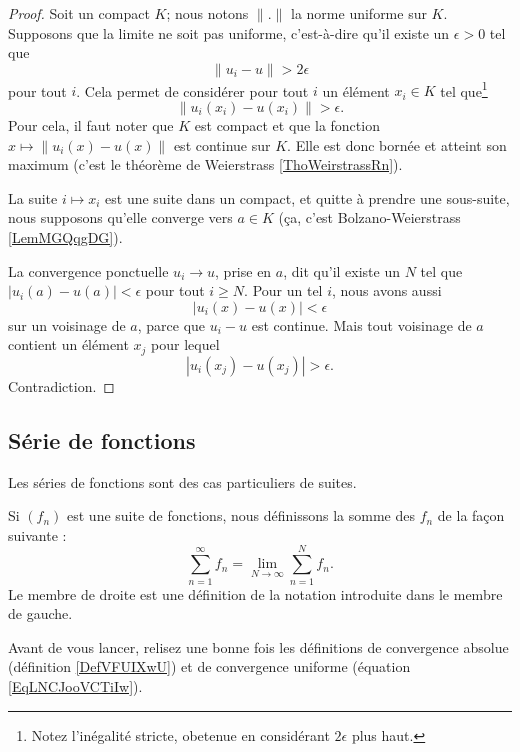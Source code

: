 \begin{proof}
    Soit un compact \( K\); nous notons \( \| . \|\) la norme uniforme sur \( K\). Supposons que la limite ne soit pas uniforme, c'est-à-dire qu'il existe un \( \epsilon>0\) tel que 
    \begin{equation}
        \| u_i-u \|> 2\epsilon
    \end{equation}
    pour tout \( i\). Cela permet de considérer pour tout \( i\) un élément \( x_i\in K\) tel que\footnote{Notez l'inégalité stricte, obetenue en considérant $2\epsilon$ plus haut.}
    \begin{equation}
        \| u_i(x_i)-u(x_i) \|> \epsilon.
    \end{equation}
    Pour cela, il faut noter que \( K\) est compact et que la fonction \( x\mapsto \| u_i(x)-u(x) \|\) est continue sur \( K\). Elle est donc bornée et atteint son maximum (c'est le théorème de Weierstrass \ref{ThoWeirstrassRn}).

    La suite \( i\mapsto x_i\) est une suite dans un compact, et quitte à prendre une sous-suite, nous supposons qu'elle converge vers \( a\in K\) (ça, c'est Bolzano-Weierstrass \ref{LemMGQqgDG}).

    La convergence ponctuelle \( u_i\to u\), prise en \( a\), dit qu'il existe un \( N\) tel que \( | u_i(a)-u(a) |<\epsilon\) pour tout \( i\geq N\). Pour un tel \( i\), nous avons aussi
    \begin{equation}
        | u_i(x)-u(x) |<\epsilon
    \end{equation}
    sur un voisinage de \( a\), parce que \( u_i-u\) est continue. Mais tout voisinage de \( a\) contient un élément \( x_j\) pour lequel
    \begin{equation}
        | u_i(x_j)-u(x_j) |>\epsilon.
    \end{equation}
    Contradiction.
\end{proof}

\subsection{Série de fonctions}

Les séries de fonctions sont des cas particuliers de suites. 

\begin{definition}      \label{DEFooYEIUooCAgrxI}
    Si \( (f_n)\) est une suite de fonctions, nous définissons la somme des \( f_n\) de la façon suivante :
    \begin{equation}
        \sum_{n=1}^{\infty}f_n=\lim_{N\to \infty} \sum_{n=1}^{N}f_n.
    \end{equation}
    Le membre de droite est une définition de la notation introduite dans le membre de gauche.
\end{definition}
Avant de vous lancer, relisez une bonne fois les définitions de convergence absolue (définition \ref{DefVFUIXwU}) et de convergence uniforme (équation \ref{EqLNCJooVCTiIw}).

